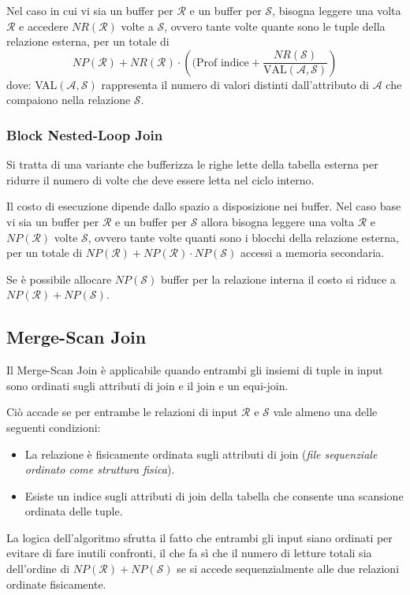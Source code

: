 \documentclass[oneside,a4paper,11pt]{book}
\theoremstyle{italicstyle}
\theoremstyle{normStyle}
\begin{document}
Nel caso in cui vi sia un buffer per $\mathcal{R}$ e un buffer per $\mathcal{S}$, bisogna 
leggere una volta $\mathcal{R}$ e accedere $NR(\mathcal{R})$ volte a $\mathcal{S}$, 
ovvero tante volte quante sono le tuple della relazione esterna, per un totale di 
\[
  NP(\mathcal{R}) + NR(\mathcal{R}) \cdot \left((\text{Prof indice} + \frac{NR(\mathcal{S})}{\text{VAL}(\mathcal{A}, \mathcal{S})}\right)
\]
dove: VAL$(\mathcal{A}, \mathcal{S})$ rappresenta il numero di valori distinti dall'attributo di $\mathcal{A}$
che compaiono nella relazione $\mathcal{S}$.
\subsubsection{Block Nested-Loop Join}
Si tratta di una variante che bufferizza le righe lette della tabella esterna per ridurre il numero 
di volte che deve essere letta nel ciclo interno.

Il costo di esecuzione dipende dallo spazio a disposizione nei buffer. Nel caso 
base vi sia un buffer per $\mathcal{R}$ e un buffer per $\mathcal{S}$ allora bisogna 
leggere una volta $\mathcal{R}$ e $NP(\mathcal{R})$ volte $\mathcal{S}$, ovvero 
tante volte quanti sono i blocchi della relazione esterna, per un totale di 
$NP(\mathcal{R}) + NP(\mathcal{R}) \cdot NP(\mathcal{S})$ accessi a memoria secondaria.

Se è possibile allocare $NP(\mathcal{S})$ buffer per la relazione interna il costo si riduce a 
$NP(\mathcal{R}) + NP(\mathcal{S})$.
\subsection{Merge-Scan Join}
Il Merge-Scan Join è applicabile quando entrambi gli insiemi di tuple in input sono ordinati 
sugli attributi di join e il join e un equi-join.

Ciò accade se per entrambe le relazioni di input $\mathcal{R}$ e $\mathcal{S}$ 
vale almeno una delle seguenti condizioni:
\begin{itemize}
  \item La relazione è fisicamente ordinata sugli attributi di join (\textit{file 
  sequenziale ordinato come struttura fisica}).
  \item Esiste un indice sugli attributi di join della tabella che consente una scansione ordinata 
  delle tuple.
\end{itemize}
La logica dell'algoritmo sfrutta il fatto che entrambi gli input siano ordinati 
per evitare di fare inutili confronti, il che fa sì che il numero di letture totali 
sia dell'ordine di $NP(\mathcal{R}) + NP(\mathcal{S})$ se si accede sequenzialmente alle 
due relazioni ordinate fisicamente.
\end{document}
